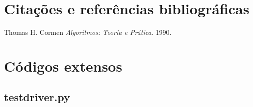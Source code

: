 \documentclass[12pt,a4paper,twoside]{report}
\begin{document}
\chapter{Citações e referências bibliográficas}
	\begin{thebibliography}{1}
		
		 Thomas H. Cormen {\em 
			Algoritmos: Teoria e Prática.
		}  1990.
		
	\end{thebibliography}







\clearpage
{}
\appendix

\chapter{Códigos extensos \label{ap:testdriver}}
\section{testdriver.py}

\end{document}
